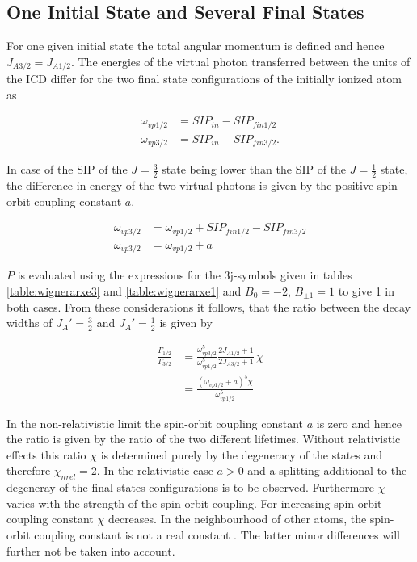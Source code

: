 \subsection{One Initial State and Several Final States}
For one given initial state the total angular momentum is defined and hence
$J_{A3/2} = J_{A1/2}$. The energies of the virtual photon transferred between
the units of the \ac{ICD} differ for the two final state configurations of
the initially ionized atom as

\begin{align}
  \omega_{vp1/2} &= SIP_{in} - SIP_{fin1/2}  \\
  \omega_{vp3/2} &= SIP_{in} - SIP_{fin3/2} .
\end{align}

In case of the \ac{SIP} of the $J=\frac 32$ state being lower than the \ac{SIP}
of the $J=\frac 12$ state, the difference in energy of the two virtual
photons is given by the positive spin-orbit coupling constant $a$.

\begin{align}
  \omega_{vp3/2} &= \omega_{vp1/2} + SIP_{fin1/2} - SIP_{fin3/2} \\
  \omega_{vp3/2} &= \omega_{vp1/2} + a
\end{align}

$P$ is evaluated using the expressions for the 3j-symbols given in tables
\ref{table:wignerarxe3} and \ref{table:wignerarxe1} and $B_0=-2$, $B_{\pm 1}=1$
to give 1 in both cases.
From these considerations it follows, that the ratio between the decay
widths of $J_A'=\frac 32$ and $J_A'=\frac 12$ is given by


\begin{align}
  \frac{\Gamma_{1/2}}{\Gamma_{3/2}}
  &= \frac{\omega_{vp3/2}^5}{\omega_{vp1/2}^5} \frac{2J_{A1/2}+1}{2J_{A3/2}+1} \,\chi\\
  &= \frac{(\omega_{vp1/2} +a)^5 \chi}{\omega_{vp1/2}^5}
\end{align}

In the non-relativistic limit the spin-orbit coupling constant $a$ is zero and
hence the ratio is given by the ratio of the two different lifetimes. Without
relativistic effects this ratio $\chi$ is determined purely by the degeneracy
of the states and therefore $\chi_{nrel} = 2$.
In the relativistic case $a>0$ and a splitting additional to the degeneray of
the final states configurations is to be observed. Furthermore $\chi$ varies
with the strength of the spin-orbit coupling. For increasing spin-orbit coupling
constant $\chi$ decreases.
In the neighbourhood of other atoms, the spin-orbit coupling constant is not
a real constant \cite{}. The latter minor differences will further not be taken
into account.




